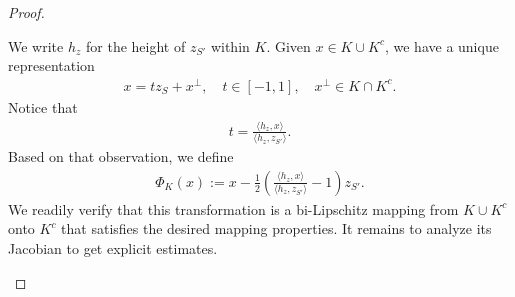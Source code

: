 \documentclass[10pt,a4paper]{article}
\begin{document}
\begin{proof}
\begin{itemize}
        We write $h_{z}$ for the height of $z_{S'}$ within $K$.
        Given $x \in K \cup K^{c}$, we have a unique representation
        \begin{align*}
            x = t z_{S} + x^{\perp}, \quad t \in [-1,1], \quad x^{\perp} \in K \cap K^{c}.
        \end{align*}
        Notice that 
        \begin{align*}
            t = \frac{\langle h_{z},x\rangle}{\langle h_{z},z_{S'}\rangle} 
            .
        \end{align*}
        Based on that observation, we define 
        \begin{align*}
            \Phi_{K}(x) := x - \frac 1 2 \left( \frac{\langle h_{z},x\rangle}{\langle h_{z},z_{S'}\rangle} - 1 \right) z_{S'}
            .
        \end{align*}
        We readily verify that this transformation is a bi-Lipschitz mapping from $K \cup K^{c}$ onto $K^{c}$
        that satisfies the desired mapping properties. 
        It remains to analyze its Jacobian to get explicit estimates. 
        

\end{itemize}
\end{proof}
\end{document}

